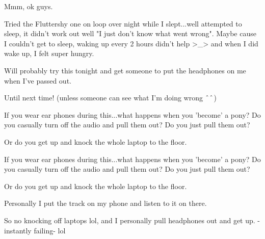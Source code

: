 \documentclass[ebook,12pt,oneside,openany]{memoir}
\newcommand{\carat}{$\char`\^$}
\newcommand{\mytexttilde}{\raisebox{0.5ex}{\texttildelow}}
\begin{document}
\begin{tcolorbox}[title=\mytexttilde{}Chaotic Parsley\mytexttilde{},colback=cyan!5!white,colframe=cyan!75!black,coltitle=white]
\par{Mmm, ok guys.}
\newline{}
\par{Tried the Fluttershy one on loop over night while I slept...well attempted to sleep, it didn't work out well "I just don't know what went wrong". Maybe cause I couldn't get to sleep, waking up every 2 hours didn't help >\_> and when I did wake up, I felt super hungry. }
\newline{}
\par{Will probably try this tonight and get someone to put the headphones on me when I've passed out. }
\newline{}
\par{Until next time! (unless someone can see what I'm doing wrong \carat{}\carat{})}
\end{tcolorbox}
\begin{tcolorbox}[title=Feather Gem]
\par{If you wear ear phones during this...what happens when you 'become' a pony?  Do you casually turn off the audio and pull them out?  Do you just pull them out?}
\par{Or do you get up and knock the whole laptop to the floor.}
\end{tcolorbox}
\begin{tcolorbox}[title=\mytexttilde{}Chaotic Parsley\mytexttilde{},colback=cyan!5!white,colframe=cyan!75!black,coltitle=white]
\begin{tcolorbox}[title=Feather Gem]
\par{If you wear ear phones during this...what happens when you 'become' a pony?  Do you casually turn off the audio and pull them out?  Do you just pull them out?}
\par{Or do you get up and knock the whole laptop to the floor.}
\end{tcolorbox}
\par{Personally I put the track on my phone and listen to it on there. }
\newline{}
\par{So no knocking off laptops lol, and I personally pull headphones out and get up. -instantly failing- lol}
\end{tcolorbox}
\end{document}
